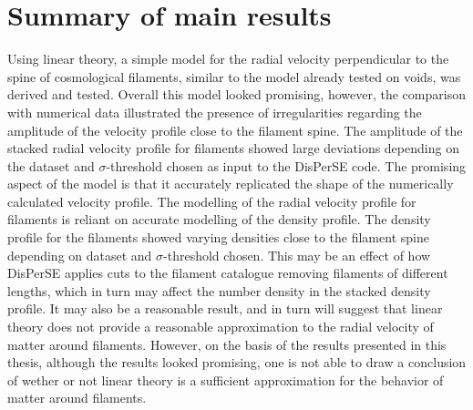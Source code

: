 \section{Summary of main results}\label{sec:mainresults}
Using linear theory, a simple model for the radial velocity perpendicular to the spine of cosmological filaments, similar to the model already tested on voids, was derived and tested. Overall this model looked promising, however, the comparison with numerical data illustrated the presence of irregularities regarding the amplitude of the velocity profile close to the filament spine. The amplitude of the stacked radial velocity profile for filaments showed large deviations depending on the dataset and $\sigma$-threshold chosen as input to the DisPerSE code. The promising aspect of the model is that it accurately replicated the shape of the numerically calculated velocity profile. The modelling of the radial velocity profile for filaments is reliant on accurate modelling of the density profile. The density profile for the filaments showed varying densities close to the filament spine depending on dataset and $\sigma$-threshold chosen. This may be an effect of how DisPerSE applies cuts to the filament catalogue removing filaments of different lengths, which in turn may affect the number density in the stacked density profile. It may also be a reasonable result, and in turn will suggest that linear theory does not provide a reasonable approximation to the radial velocity of matter around filaments. However, on the basis of the results presented in this thesis, although the results looked promising, one is not able to draw a conclusion of wether or not linear theory is a sufficient approximation for the behavior of matter around filaments.\\\indent
